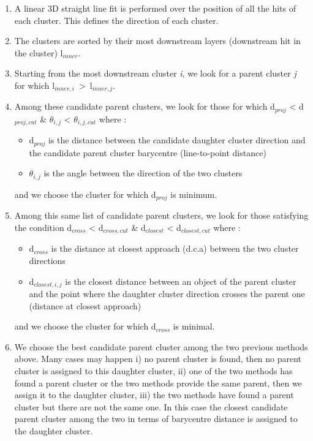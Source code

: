 \documentclass[cits]{JINST}
\begin{document}
\begin{enumerate}
  \item A linear 3D straight line fit is performed over the position of all the hits of each cluster. This defines the direction of each cluster.
  \item The clusters are sorted by their most downstream layers (downstream hit in the cluster) l$_{inner}$.
  \item Starting from the most downstream cluster \textit{i}, we look for a parent cluster \textit{j} for which l$_{inner,i}$~>~l$_{inner,j}$.
  \item Among these candidate parent clusters, we look for those for which d$_{proj}$ < d$_{proj,cut}$ \& $\theta_{i,j}$ < $\theta_{i,j,cut}$  where :
  \begin{itemize}
    \item d$_{proj}$ is the distance between the candidate daughter cluster direction and the candidate parent cluster barycentre (line-to-point distance)
    \item $\theta_{i,j}$ is the angle between the direction of the two clusters
  \end{itemize}
  and we choose the cluster for which d$_{proj}$ is minimum.  
  \item Among this same list of candidate parent clusters, we look for those satisfying the condition d$_{cross}$ < d$_{cross,cut}$ \& d$_{closest}$ < d$_{closest,cut}$ where :
  \begin{itemize}
    \item d$_{cross}$ is the distance at closest approach (d.c.a) between the two cluster directions
    \item d$_{closest,i,j}$ is the closest distance between an object of the parent cluster and the point where the daughter cluster direction crosses the parent one (distance at closest approach) 
  \end{itemize}
  and we choose the cluster for which d$_{cross}$ is minimal.
  \item We choose the best candidate parent cluster among the two previous methods above. Many cases may happen i) no parent cluster is found, then no parent cluster is assigned to this daughter cluster, ii) one of the two methods has found a parent cluster or the two methods provide the same parent, then we assign it to the daughter cluster, iii) the two methods have found a parent cluster but there are not the same one. In this case the closest candidate parent cluster among the two in terms of barycentre distance is assigned to the daughter cluster.

\end{enumerate}
\end{document}
